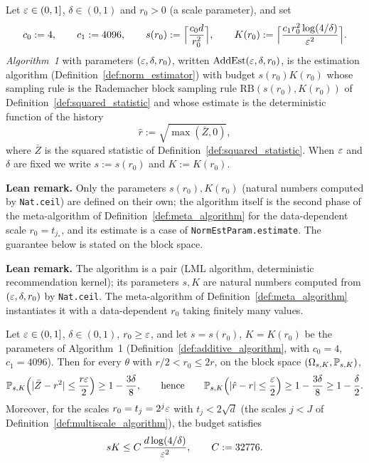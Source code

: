 \begin{definition}\label{def:additive_algorithm}
\leanok
{}
Let $\varepsilon \in (0,1]$, $\delta \in (0,1)$ and $r_0 > 0$ (a scale parameter), and set
\[
  c_0 := 4, \qquad c_1 := 4096, \qquad
  s(r_0) := \Big\lceil \frac{c_0 d}{r_0^2} \Big\rceil, \qquad
  K(r_0) := \Big\lceil \frac{c_1 r_0^2 \log(4/\delta)}{\varepsilon^2} \Big\rceil .
\]
\emph{Algorithm~1} with parameters $(\varepsilon,\delta,r_0)$, written
$\mathrm{AddEst}(\varepsilon,\delta,r_0)$, is the estimation algorithm
(Definition~\ref{def:norm_estimator}) with budget $s(r_0)K(r_0)$ whose sampling rule is the
Rademacher block sampling rule $\mathrm{RB}(s(r_0),K(r_0))$ of
Definition~\ref{def:squared_statistic} and whose estimate is the deterministic function of
the history
\[
  \hat r := \sqrt{\max(\bar Z, 0)} ,
\]
where $\bar Z$ is the squared statistic of Definition~\ref{def:squared_statistic}. When
$\varepsilon$ and $\delta$ are fixed we write $s := s(r_0)$ and $K := K(r_0)$.
\end{definition}

\textbf{Lean remark.} Only the parameters $s(r_0), K(r_0)$ (natural numbers computed by
\texttt{Nat.ceil}) are defined on their own; the algorithm itself is the second phase of the
meta-algorithm of Definition~\ref{def:meta_algorithm} for the data-dependent scale
$r_0 = t_{j_*}$, and its estimate is a case of \texttt{NormEstParam.estimate}. The guarantee
below is stated on the block space.

\textbf{Lean remark.} The algorithm is a pair (LML algorithm, deterministic recommendation
kernel); its parameters $s, K$ are natural numbers computed from $(\varepsilon,\delta,r_0)$ by
\texttt{Nat.ceil}. The meta-algorithm of Definition~\ref{def:meta_algorithm} instantiates it
with a data-dependent $r_0$ taking finitely many values.

\begin{theorem}\label{thm:additive_estimation}
\leanok
{}
Let $\varepsilon \in (0,1]$, $\delta \in (0,1)$, $r_0 \ge \varepsilon$, and let $s = s(r_0)$, $K = K(r_0)$
be the parameters of Algorithm~1 (Definition~\ref{def:additive_algorithm}, with
$c_0 = 4$, $c_1 = 4096$). Then for every
$\theta$ with $r/2 < r_0 \le 2r$, on the block space $(\Omega_{s,K}, \mathbb{P}_{s,K})$,
\[
  \mathbb{P}_{s,K}\Big( \lvert \bar Z - r^2 \rvert \le \frac{r\varepsilon}{2} \Big) \ge 1 - \frac{3\delta}{8},
  \qquad\text{hence}\qquad
  \mathbb{P}_{s,K}\Big( \lvert \hat r - r \rvert \le \frac{\varepsilon}{2} \Big) \ge 1 - \frac{3\delta}{8}
  \ge 1 - \frac{\delta}{2} .
\]
Moreover, for the scales $r_0 = t_j = 2^j\varepsilon$ with $t_j < 2\sqrt d$ (the scales $j < J$ of
Definition~\ref{def:multiscale_algorithm}), the budget satisfies
\[
  sK \le C\,\frac{d\log(4/\delta)}{\varepsilon^2}, \qquad C := 32776 .
\]
\end{theorem}

